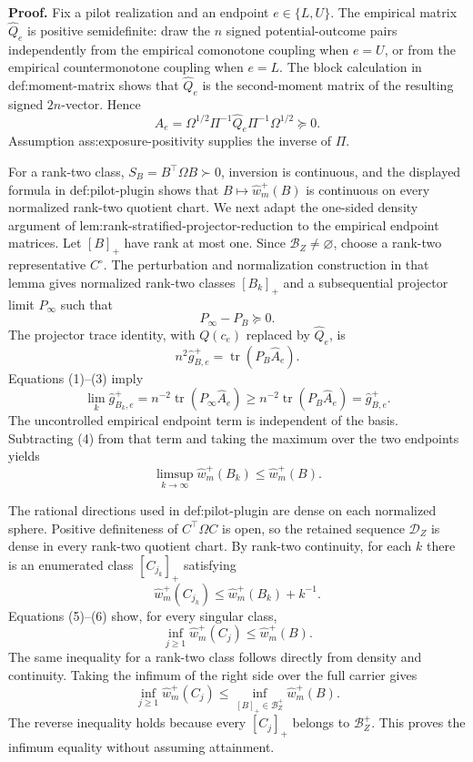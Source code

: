 \textbf{Proof.}
Fix a pilot realization and an endpoint \(e\in\{L,U\}\).  The empirical matrix \(\widehat Q_e\) is positive semidefinite: draw the \(n\) signed potential-outcome pairs independently from the empirical comonotone coupling when \(e=U\), or from the empirical countermonotone coupling when \(e=L\).  The block calculation in def:moment-matrix shows that \(\widehat Q_e\) is the second-moment matrix of the resulting signed \(2n\)-vector.  Hence
\[
\widehat A_e
=\Omega^{1/2}\Pi^{-1}\widehat Q_e\Pi^{-1}\Omega^{1/2}
\succeq0.
\tag{1}
\]
Assumption ass:exposure-positivity supplies the inverse of \(\Pi\).

For a rank-two class, \(S_B=B^{\top}\Omega B\succ0\), inversion is continuous, and the displayed formula in def:pilot-plugin shows that \(B\mapsto\widehat w_m^+(B)\) is continuous on every normalized rank-two quotient chart.  We next adapt the one-sided density argument of lem:rank-stratified-projector-reduction to the empirical endpoint matrices.  Let \([B]_+\) have rank at most one.  Since \(\mathcal B_Z\ne\varnothing\), choose a rank-two representative \(C^\circ\).  The perturbation and normalization construction in that lemma gives normalized rank-two classes \([B_k]_+\) and a subsequential projector limit \(P_\infty\) such that
\[
P_\infty-P_B\succeq0.
\tag{2}
\]
The projector trace identity, with \(Q(c_e)\) replaced by \(\widehat Q_e\), is
\[
n^2\widehat g_{B,e}^+
=\operatorname{tr}(P_B\widehat A_e).
\tag{3}
\]
Equations (1)--(3) imply
\[
\lim_k\widehat g_{B_k,e}^+
=n^{-2}\operatorname{tr}(P_\infty\widehat A_e)
\ge n^{-2}\operatorname{tr}(P_B\widehat A_e)
=\widehat g_{B,e}^+.
\tag{4}
\]
The uncontrolled empirical endpoint term is independent of the basis.  Subtracting (4) from that term and taking the maximum over the two endpoints yields
\[
\limsup_{k\to\infty}\widehat w_m^+(B_k)
\le\widehat w_m^+(B).
\tag{5}
\]

The rational directions used in def:pilot-plugin are dense on each normalized sphere.  Positive definiteness of \(C^{\top}\Omega C\) is open, so the retained sequence \(\mathcal D_Z\) is dense in every rank-two quotient chart.  By rank-two continuity, for each \(k\) there is an enumerated class \([C_{j_k}]_+\) satisfying
\[
\widehat w_m^+(C_{j_k})
\le\widehat w_m^+(B_k)+k^{-1}.
\tag{6}
\]
Equations (5)--(6) show, for every singular class,
\[
\inf_{j\ge1}\widehat w_m^+(C_j)
\le\widehat w_m^+(B).
\tag{7}
\]
The same inequality for a rank-two class follows directly from density and continuity.  Taking the infimum of the right side over the full carrier gives
\[
\inf_{j\ge1}\widehat w_m^+(C_j)
\le\inf_{[B]_+\in\mathcal B_Z^+}\widehat w_m^+(B).
\tag{8}
\]
The reverse inequality holds because every \([C_j]_+\) belongs to \(\mathcal B_Z^+\).  This proves the infimum equality without assuming attainment.


